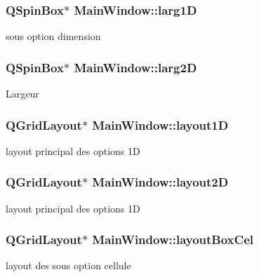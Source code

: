 \subsubsection[{\texorpdfstring{larg1D}{larg1D}}]{\setlength{\rightskip}{0pt plus 5cm}Q\+Spin\+Box$\ast$ Main\+Window\+::larg1D\hspace{0.3cm}{\ttfamily [private]}}\hypertarget{class_main_window_a8ea57e6e7e57cbe0e03ebb75a385439a}{}\label{class_main_window_a8ea57e6e7e57cbe0e03ebb75a385439a}
sous option dimension 
\subsubsection[{\texorpdfstring{larg2D}{larg2D}}]{\setlength{\rightskip}{0pt plus 5cm}Q\+Spin\+Box$\ast$ Main\+Window\+::larg2D\hspace{0.3cm}{\ttfamily [private]}}\hypertarget{class_main_window_af66e8d082f97a24629399dec9da7aa03}{}\label{class_main_window_af66e8d082f97a24629399dec9da7aa03}
Largeur 
\subsubsection[{\texorpdfstring{layout1D}{layout1D}}]{\setlength{\rightskip}{0pt plus 5cm}Q\+Grid\+Layout$\ast$ Main\+Window\+::layout1D\hspace{0.3cm}{\ttfamily [private]}}\hypertarget{class_main_window_a25605b8d3fa4ec4b5cef93bb266136e7}{}\label{class_main_window_a25605b8d3fa4ec4b5cef93bb266136e7}
layout principal des options 1D 
\subsubsection[{\texorpdfstring{layout2D}{layout2D}}]{\setlength{\rightskip}{0pt plus 5cm}Q\+Grid\+Layout$\ast$ Main\+Window\+::layout2D\hspace{0.3cm}{\ttfamily [private]}}\hypertarget{class_main_window_a648672720c15d3b363c131c91408422d}{}\label{class_main_window_a648672720c15d3b363c131c91408422d}
layout principal des options 1D 
\subsubsection[{\texorpdfstring{layout\+Box\+Cel}{layoutBoxCel}}]{\setlength{\rightskip}{0pt plus 5cm}Q\+Grid\+Layout$\ast$ Main\+Window\+::layout\+Box\+Cel\hspace{0.3cm}{\ttfamily [private]}}\hypertarget{class_main_window_accffbd02cf5f6e812592410d90a2bf01}{}\label{class_main_window_accffbd02cf5f6e812592410d90a2bf01}
layout des sous option cellule 
